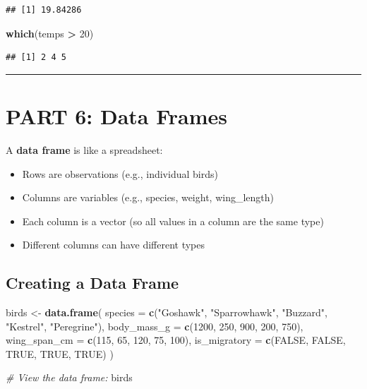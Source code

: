 \documentclass[
]{article}
\newenvironment{Shaded}{\begin{snugshade}}{\end{snugshade}}
\newcommand{\AttributeTok}[1]{\textcolor[rgb]{0.13,0.29,0.53}{#1}}
\newcommand{\CommentTok}[1]{\textcolor[rgb]{0.56,0.35,0.01}{\textit{#1}}}
\newcommand{\ConstantTok}[1]{\textcolor[rgb]{0.56,0.35,0.01}{#1}}
\newcommand{\DecValTok}[1]{\textcolor[rgb]{0.00,0.00,0.81}{#1}}
\newcommand{\FunctionTok}[1]{\textcolor[rgb]{0.13,0.29,0.53}{\textbf{#1}}}
\newcommand{\NormalTok}[1]{#1}
\newcommand{\OtherTok}[1]{\textcolor[rgb]{0.56,0.35,0.01}{#1}}
\newcommand{\SpecialCharTok}[1]{\textcolor[rgb]{0.81,0.36,0.00}{\textbf{#1}}}
\newcommand{\StringTok}[1]{\textcolor[rgb]{0.31,0.60,0.02}{#1}}
\providecommand{\tightlist}{%
  \setlength{\itemsep}{0pt}\setlength{\parskip}{0pt}}
\begin{document}
\begin{verbatim}
## [1] 19.84286
\end{verbatim}

\begin{Shaded}
\begin{Highlighting}[]
\FunctionTok{which}\NormalTok{(temps }\SpecialCharTok{\textgreater{}} \DecValTok{20}\NormalTok{)}
\end{Highlighting}
\end{Shaded}

\begin{verbatim}
## [1] 2 4 5
\end{verbatim}

\begin{center}\rule{0.5\linewidth}{0.5pt}\end{center}

\section{PART 6: Data Frames}\label{part-6-data-frames}

A \textbf{data frame} is like a spreadsheet:

\begin{itemize}
\tightlist
\item
  Rows are observations (e.g., individual birds)
\item
  Columns are variables (e.g., species, weight, wing\_length)
\item
  Each column is a vector (so all values in a column are the same type)
\item
  Different columns can have different types
\end{itemize}

\subsection{Creating a Data Frame}\label{creating-a-data-frame}

\begin{Shaded}
\begin{Highlighting}[]
\NormalTok{birds }\OtherTok{\textless{}{-}} \FunctionTok{data.frame}\NormalTok{(}
  \AttributeTok{species =} \FunctionTok{c}\NormalTok{(}\StringTok{"Goshawk"}\NormalTok{, }\StringTok{"Sparrowhawk"}\NormalTok{, }\StringTok{"Buzzard"}\NormalTok{, }\StringTok{"Kestrel"}\NormalTok{, }\StringTok{"Peregrine"}\NormalTok{),}
  \AttributeTok{body\_mass\_g =} \FunctionTok{c}\NormalTok{(}\DecValTok{1200}\NormalTok{, }\DecValTok{250}\NormalTok{, }\DecValTok{900}\NormalTok{, }\DecValTok{200}\NormalTok{, }\DecValTok{750}\NormalTok{),}
  \AttributeTok{wing\_span\_cm =} \FunctionTok{c}\NormalTok{(}\DecValTok{115}\NormalTok{, }\DecValTok{65}\NormalTok{, }\DecValTok{120}\NormalTok{, }\DecValTok{75}\NormalTok{, }\DecValTok{100}\NormalTok{),}
  \AttributeTok{is\_migratory =} \FunctionTok{c}\NormalTok{(}\ConstantTok{FALSE}\NormalTok{, }\ConstantTok{FALSE}\NormalTok{, }\ConstantTok{TRUE}\NormalTok{, }\ConstantTok{TRUE}\NormalTok{, }\ConstantTok{TRUE}\NormalTok{)}
\NormalTok{)}

\CommentTok{\# View the data frame:}
\NormalTok{birds}
\end{Highlighting}
\end{Shaded}
\end{document}
